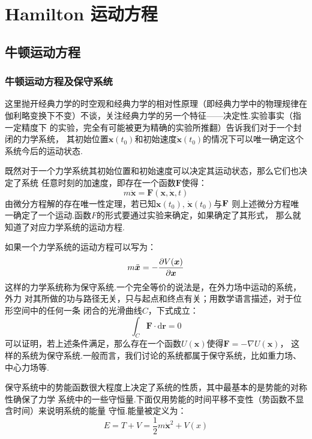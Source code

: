\chapter{Hamilton 运动方程}
    \section{牛顿运动方程}
    \subsection{牛顿运动方程及保守系统}
    \par
    这里抛开经典力学的时空观和经典力学的相对性原理（即经典力学中的物理规律在
    伽利略变换下不变）不谈，关注经典力学的另一个特征——决定性.实验事实（指一定精度下
    的实验，完全有可能被更为精确的实验所推翻）告诉我们对于一个封闭的力学系统，
    其初始位置$\bm{x}(t_0)$和初始速度$\dot{\bm{x}}(t_0)$的情况下可以唯一确定这个
    系统今后的运动状态.
    \par 既然对于一个力学系统其初始位置和初始速度可以决定其运动状态，那么它们也决定了系统
    任意时刻的加速度，即存在一个函数$\bm{F}$使得：
    \begin{equation}
        m\ddot{\bm{x}} = \bm{F}(\bm{x}, \dot{\bm{x}}, t)
    \end{equation}
    由微分方程解的存在唯一性定理，若已知$\bm{x}(t_0),\, \dot{\bm{x}}(t_0)$与$\mathbf{F}$
    则上述微分方程唯一确定了一个运动.函数$F$的形式要通过实验来确定，如果确定了其形式，
    那么就知道了对应力学系统的运动方程.
    \par 如果一个力学系统的运动方程可以写为：
    \begin{equation}
        m\ddot{\bm{x}} = -\frac{\partial{V(\bm{x})}}{\partial{\bm{x}}}
    \end{equation}
    这样的力学系统称为保守系统.一个完全等价的说法是，在外力场中运动的系统，外力
    对其所做的功与路径无关，只与起点和终点有关；用数学语言描述，对于位形空间中的任何一条
    闭合的光滑曲线$C$，下式成立：
    \begin{equation}
        \int_{C}\bm{F}\cdot\mathrm{d} \bm{r} = 0
    \end{equation}
    可以证明，若上述条件满足，那么存在一个函数$U(\bm{x})$使得$\bm{F} = -\nabla U(\bm{x})$，
    这样的系统为保守系统.一般而言，我们讨论的系统都属于保守系统，比如重力场、中心力场等.
    \par 
    保守系统中的势能函数很大程度上决定了系统的性质，其中最基本的是势能的对称性确保了力学
    系统中的一些守恒量.下面仅用势能的时间平移不变性（势函数不显含时间）来说明系统的能量
    守恒.能量被定义为：
    \begin{equation}
        E = T + V = \frac{1}{2}m\dot{\bm{x}}^2 + V(x)
    \end{equation}
